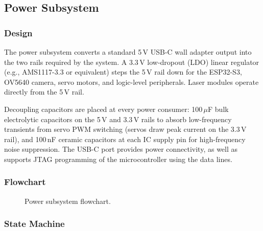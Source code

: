 \documentclass[12pt]{extarticle}
\begin{document}
\subsection{Power Subsystem}

\subsubsection{Design}

The power subsystem converts a standard 5\,V USB-C wall adapter output into the two rails
required by the system. A 3.3\,V low-dropout (LDO) linear regulator (e.g., AMS1117-3.3 or
equivalent) steps the 5\,V rail down for the ESP32-S3, OV5640 camera, servo motors, and
logic-level peripherals. Laser modules operate directly from the 5\,V rail.

Decoupling capacitors are placed at every power consumer: 100\,$\mu$F bulk electrolytic
capacitors on the 5\,V and 3.3\,V rails to absorb low-frequency transients from servo PWM
switching (servos draw peak current on the 3.3\,V rail), and 100\,nF ceramic capacitors at
each IC supply pin for high-frequency noise suppression. The USB-C port provides power
connectivity, as well as supports JTAG programming of the microcontroller using the 
data lines.


\subsubsection{Flowchart}

\begin{figure}[H]
\centering
{}
\caption{Power subsystem flowchart.}
\label{fig:flow-power}
\end{figure}

\subsubsection{State Machine}
\end{document}
